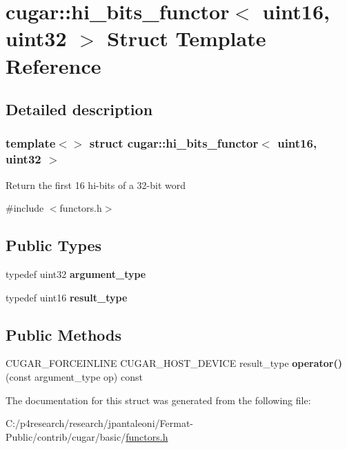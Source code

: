\hypertarget{structcugar_1_1hi__bits__functor_3_01uint16_00_01uint32_01_4}{}\section{cugar\+:\+:hi\+\_\+bits\+\_\+functor$<$ uint16, uint32 $>$ Struct Template Reference}
\label{structcugar_1_1hi__bits__functor_3_01uint16_00_01uint32_01_4}


\subsection{Detailed description}
\subsubsection*{template$<$$>$\newline
struct cugar\+::hi\+\_\+bits\+\_\+functor$<$ uint16, uint32 $>$}

Return the first 16 hi-\/bits of a 32-\/bit word 

{\ttfamily \#include $<$functors.\+h$>$}

\subsection*{Public Types}
\begin{DoxyCompactItemize}
\item 
\mbox{\label{structcugar_1_1hi__bits__functor_3_01uint16_00_01uint32_01_4_ab5d53f1b328a6c647cf17ea4d2f8bd8c}} 
typedef uint32 {\bfseries argument\+\_\+type}
\item 
\mbox{\label{structcugar_1_1hi__bits__functor_3_01uint16_00_01uint32_01_4_a7ba3fb554f97b7f150cc0ed0c2acaa45}} 
typedef uint16 {\bfseries result\+\_\+type}
\end{DoxyCompactItemize}
\subsection*{Public Methods}
\begin{DoxyCompactItemize}
\item 
\mbox{\label{structcugar_1_1hi__bits__functor_3_01uint16_00_01uint32_01_4_a37339ca897547b2e582bf0a899863af3}} 
C\+U\+G\+A\+R\+\_\+\+F\+O\+R\+C\+E\+I\+N\+L\+I\+NE C\+U\+G\+A\+R\+\_\+\+H\+O\+S\+T\+\_\+\+D\+E\+V\+I\+CE result\+\_\+type {\bfseries operator()} (const argument\+\_\+type op) const
\end{DoxyCompactItemize}


The documentation for this struct was generated from the following file\+:\begin{DoxyCompactItemize}
\item 
C\+:/p4research/research/jpantaleoni/\+Fermat-\/\+Public/contrib/cugar/basic/\hyperlink{functors_8h}{functors.\+h}\end{DoxyCompactItemize}

